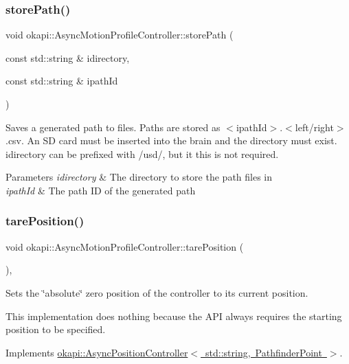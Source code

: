 \subsubsection{\texorpdfstring{storePath()}{storePath()}}
{\footnotesize\ttfamily void okapi\+::\+Async\+Motion\+Profile\+Controller\+::store\+Path (\begin{DoxyParamCaption}\item[{const std\+::string \&}]{idirectory,  }\item[{const std\+::string \&}]{ipath\+Id }\end{DoxyParamCaption})}

Saves a generated path to files. Paths are stored as {\ttfamily $<$ipath\+Id$>$.$<$left/right$>$.csv}. An SD card must be inserted into the brain and the directory must exist. {\ttfamily idirectory} can be prefixed with {\ttfamily /usd/}, but it this is not required.


\begin{DoxyParams}{Parameters}
{\em idirectory} & The directory to store the path files in \\
\hline
{\em ipath\+Id} & The path ID of the generated path \\
\hline
\end{DoxyParams}
\mbox{\label{classokapi_1_1AsyncMotionProfileController_afc3476c87e3428f9f166273688e45249}} 
\subsubsection{\texorpdfstring{tarePosition()}{tarePosition()}}
{\footnotesize\ttfamily void okapi\+::\+Async\+Motion\+Profile\+Controller\+::tare\+Position (\begin{DoxyParamCaption}{ }\end{DoxyParamCaption})\hspace{0.3cm}{\ttfamily [override]}, {\ttfamily [virtual]}}

Sets the \char`\"{}absolute\char`\"{} zero position of the controller to its current position.

This implementation does nothing because the A\+PI always requires the starting position to be specified. 

Implements \mbox{\hyperlink{classokapi_1_1AsyncPositionController_a0af03d0035343cbf843a19374f38a059}{okapi\+::\+Async\+Position\+Controller$<$ std\+::string, Pathfinder\+Point $>$}}.

